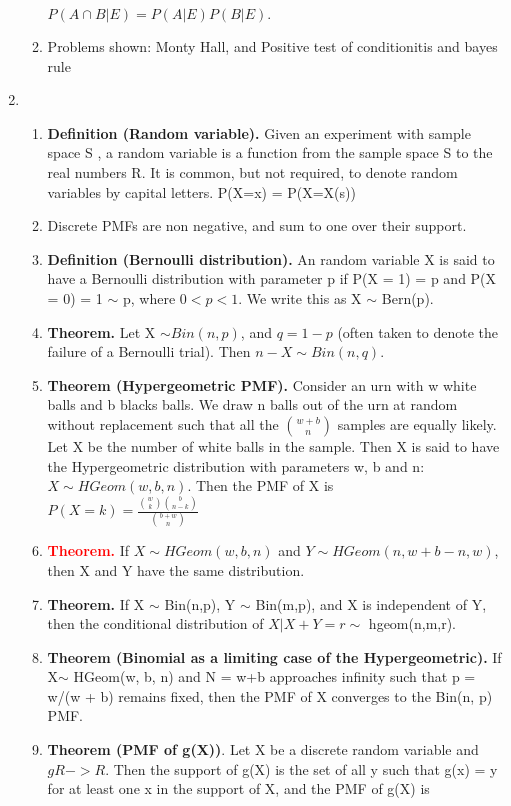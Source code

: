 \documentclass[11pt]{article}
\begin{document}
\begin{enumerate}
\begin{enumerate}
	$P(A \cap B | E) = P(A | E)P(B | E).$
	\item Problems shown: Monty Hall, and Positive test of conditionitis and bayes rule
\end{enumerate}
\item
\begin{enumerate}
	\item \textbf{Definition (Random variable).} Given an experiment with sample space S , a random variable is a function
	from the sample space S to the real numbers R. It is common, but not required, to denote random variables
	by capital letters. P(X=x) = P(X=X(s))
	\item Discrete PMFs are non negative, and sum to one over their support.
	\item \textbf{Definition (Bernoulli distribution). }An random variable X is said to have a Bernoulli distribution with
	parameter p if P(X = 1) = p and P(X = 0) = 1 $\sim$ p, where $0 < p < 1$. We write this as X $\sim$ Bern(p).
	\item \textbf{Theorem. }Let X $\sim Bin(n, p)$, and $q = 1 - p$ (often taken to denote the failure of a Bernoulli trial). Then
	$n - X \sim Bin(n, q)$.
	\item \textbf{Theorem (Hypergeometric PMF).} Consider an urn with w white balls and b blacks balls. We draw n balls
	out of the urn at random without replacement such that all the
	$\binom{w+b}{n}$
	samples are equally likely. Let X be the
	number of white balls in the sample. Then X is said to have the Hypergeometric distribution with parameters
	w, b and n: $X \sim HGeom(w, b, n)$. Then the PMF of X is\\
	$P(X=k)=\frac{\binom{w}{k}\binom{b}{n-k}}{\binom{b+w}{n}}$
	\item \textcolor{red}{\textbf{Theorem.}} If $X \sim HGeom(w, b, n)$ and $Y \sim HGeom(n,w+b-n,w)$, then X and Y have the same distribution.
	\item \textbf{Theorem.} If X $\sim$ Bin(n,p), Y $\sim$ Bin(m,p), and X is independent of Y, then the conditional distribution of
	$X|X+Y=r \sim$ hgeom(n,m,r).
	\item \textbf{Theorem (Binomial as a limiting case of the Hypergeometric).} If X$\sim$ HGeom(w, b, n) and N = w+b approaches infinity
	such that p = w/(w + b) remains fixed, then the PMF of X converges to the Bin(n, p) PMF.
	\item \textbf{ Theorem (PMF of g(X))}. Let X be a discrete random variable and $g R->R$. Then the support of g(X) is
	the set of all y such that g(x) = y for at least one x in the support of X, and the PMF of g(X) is

\end{enumerate}
\end{enumerate}
\end{document}
